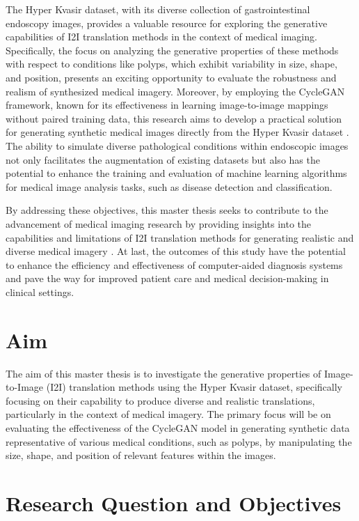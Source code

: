 \documentclass[UKenglish,12pt]{master-style}
\begin{document}
The Hyper Kvasir dataset, with its diverse collection of gastrointestinal endoscopy images, provides a valuable resource for exploring the generative capabilities of I2I translation methods in the context of medical imaging. Specifically, the focus on analyzing the generative properties of these methods with respect to conditions like polyps, which exhibit variability in size, shape, and position, presents an exciting opportunity to evaluate the robustness and realism of synthesized medical imagery. Moreover, by employing the CycleGAN framework, known for its effectiveness in learning image-to-image mappings without paired training data, this research aims to develop a practical solution for generating synthetic medical images directly from the Hyper Kvasir dataset \cite{CycleGAN} . The ability to simulate diverse pathological conditions within endoscopic images not only facilitates the augmentation of existing datasets but also has the potential to enhance the training and evaluation of machine learning algorithms for medical image analysis tasks, such as disease detection and classification.

By addressing these objectives, this master thesis seeks to contribute to the advancement of medical imaging research by providing insights into the capabilities and limitations of I2I translation methods for generating realistic and diverse medical imagery \cite{I2I} . At last, the outcomes of this study have the potential to enhance the efficiency and effectiveness of computer-aided diagnosis systems and pave the way for improved patient care and medical decision-making in clinical settings.

\section{Aim}

The aim of this master thesis is to investigate the generative properties of Image-to-Image (I2I) translation methods using the Hyper Kvasir dataset, specifically focusing on their capability to produce diverse and realistic translations, particularly in the context of medical imagery. The primary focus will be on evaluating the effectiveness of the CycleGAN model in generating synthetic data representative of various medical conditions, such as polyps, by manipulating the size, shape, and position of relevant features within the images.

\section{Research Question and Objectives}
\end{document}
